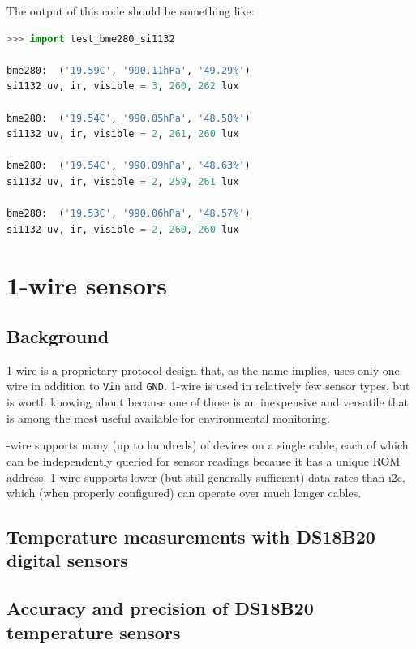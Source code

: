 \begin{enumerate}
The output of this code should be something like:
\begin{lstlisting}[language=Python]
>>> import test_bme280_si1132

bme280:  ('19.59C', '990.11hPa', '49.29%')
si1132 uv, ir, visible = 3, 260, 262 lux

bme280:  ('19.54C', '990.05hPa', '48.58%')
si1132 uv, ir, visible = 2, 261, 260 lux

bme280:  ('19.54C', '990.09hPa', '48.63%')
si1132 uv, ir, visible = 2, 259, 261 lux

bme280:  ('19.53C', '990.06hPa', '48.57%')
si1132 uv, ir, visible = 2, 260, 260 lux
\end{lstlisting}

\end{enumerate}

\section{\color{gray}1-wire sensors \color{black}}
\subsection{\color{gray} Background \color{black}}
1-wire is a proprietary protocol design that, as the name implies, uses only one wire in addition to \texttt{Vin} and \texttt{GND}.
1-wire is used in relatively few sensor types, but is worth knowing about because one of those is an inexpensive and versatile  that is among the most useful available for environmental monitoring.

-wire supports many (up to hundreds) of devices on a single cable, each of which can be independently queried for sensor readings because it has a unique ROM address.
1-wire supports lower (but still generally sufficient) data rates than \i2c, which (when properly configured) can operate over much longer cables.

\subsection{\color{gray} Temperature measurements with DS18B20 digital sensors \color{black}}
\subsection{\color{gray} Accuracy and precision of DS18B20 temperature sensors \color{black}}

